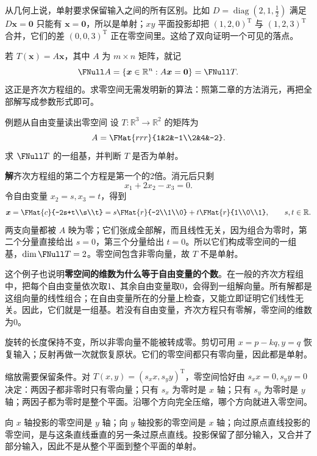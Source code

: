 \documentclass[a4paper,12pt,twoside,openany,fontset=none]{ctexbook}
\newcounter{example}[chapter]
\newenvironment{example}[1][]{\begin{exBox}{例题}{#1}}{\end{exBox}}
\numberwithin{equation}{chapter}
\begin{document}
从几何上说，单射要求保留输入之间的所有区别。比如 $D=\operatorname{diag}(2,1,\tfrac12)$ 满足 $D\boldsymbol x=\boldsymbol0$ 只能有 $\boldsymbol x=\boldsymbol0$，所以是单射；$xy$ 平面投影却把 $(1,2,0)^{\mathrm T}$ 与 $(1,2,3)^{\mathrm T}$ 合并，它们的差 $(0,0,3)^{\mathrm T}$ 正在零空间里。这给了双向证明一个可见的落点。

若 $T(\boldsymbol x)=A\boldsymbol x$，其中 $A$ 为 $m\times n$ 矩阵，就记
\[
 \FNull A=\{\boldsymbol x\in\mathbb R^n:A\boldsymbol x=\boldsymbol0\}
 =\FNull T.
\]
这正是齐次方程组的。求零空间无需发明新的算法：照第二章的方法消元，再把全部解写成参数形式即可。

\begin{example}[从自由变量读出零空间]
设 $T:\mathbb R^3\to\mathbb R^2$ 的矩阵为
\[
 A=\FMat{rrr}{1&2&-1\\2&4&-2}.
\]
求 $\FNull T$ 的一组基，并判断 $T$ 是否为单射。
\end{example}
\textbf{解}\quad 齐次方程组的第二个方程是第一个的2倍。消元后只剩
\[
 x_1+2x_2-x_3=0.
\]
令自由变量 $x_2=s,x_3=t$，得到
\[
 \boldsymbol x=\FMat{c}{-2s+t\\s\\t}
 =s\FMat{r}{-2\\1\\0}+t\FMat{r}{1\\0\\1},\qquad s,t\in\mathbb R.
\]
两支向量都被 $A$ 映为零；它们张成全部解，而且线性无关，因为组合为零时，第二个分量直接给出 $s=0$，第三个分量给出 $t=0$。所以它们构成零空间的一组基，$\dim\FNull T=2$。零空间包含非零向量，故 $T$ 不是单射。

这个例子也说明\textbf{零空间的维数为什么等于自由变量的个数}。在一般的齐次方程组中，把每个自由变量依次取1、其余自由变量取0，会得到一组解向量。所有解都是这组向量的线性组合；在自由变量所在的分量上检查，又能立即证明它们线性无关。因此，它们就是一组基。若没有自由变量，齐次方程只有零解，零空间的维数为0。

旋转的长度保持不变，所以非零向量不能被转成零。剪切可用 $x=p-kq,y=q$ 恢复输入；反射再做一次就恢复原状。它们的零空间都只有零向量，因此都是单射。

缩放需要保留条件。对 $T(x,y)=(s_xx,s_yy)^{\mathrm T}$，零空间恰好由 $s_xx=0,s_yy=0$ 决定：两因子都非零时只有零向量；只有 $s_x$ 为零时是 $x$ 轴；只有 $s_y$ 为零时是 $y$ 轴；两因子都为零时是整个平面。沿哪个方向完全压缩，哪个方向就进入零空间。

向 $x$ 轴投影的零空间是 $y$ 轴；向 $y$ 轴投影的零空间是 $x$ 轴；向过原点直线投影的零空间，是与这条直线垂直的另一条过原点直线。投影保留了部分输入，又合并了部分输入，因此不是从整个平面到整个平面的单射。
\end{document}
